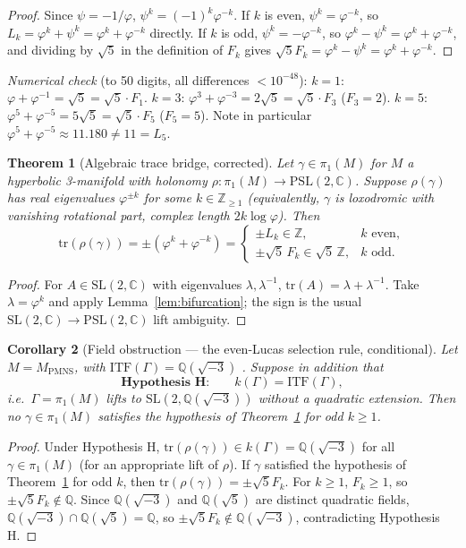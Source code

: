\documentclass[12pt]{article}
\newtheorem{theorem}{Theorem}
\newtheorem{corollary}[theorem]{Corollary}
\theoremstyle{definition}
\newcommand{\Z}{\mathbb{Z}}
\newcommand{\Q}{\mathbb{Q}}
\newcommand{\C}{\mathbb{C}}
\newcommand{\ph}{\varphi}
\newcommand{\logph}{\log\ph}
\newcommand{\tr}{\mathrm{tr}}
\newcommand{\ITF}{\mathrm{ITF}}
\begin{document}
\begin{proof}
Since $\psi=-1/\ph$, $\psi^k=(-1)^k\ph^{-k}$. If $k$ is even,
$\psi^k=\ph^{-k}$, so $L_k=\ph^k+\psi^k=\ph^k+\ph^{-k}$ directly. If
$k$ is odd, $\psi^k=-\ph^{-k}$, so $\ph^k-\psi^k=\ph^k+\ph^{-k}$, and
dividing by $\sqrt5$ in the definition of $F_k$ gives
$\sqrt5F_k=\ph^k-\psi^k=\ph^k+\ph^{-k}$.
\end{proof}

\noindent\emph{Numerical check} (to 50 digits, all differences
$<10^{-48}$): $k=1$: $\ph+\ph^{-1}=\sqrt5=\sqrt5\cdot F_1$. $k=3$:
$\ph^3+\ph^{-3}=2\sqrt5=\sqrt5\cdot F_3$ ($F_3=2$). $k=5$:
$\ph^5+\ph^{-5}=5\sqrt5=\sqrt5\cdot F_5$ ($F_5=5$). Note in particular
$\ph^5+\ph^{-5}\approx11.180\neq11=L_5$.

\begin{theorem}[Algebraic trace bridge, corrected]
\label{thm:bridge}
Let $\gamma\in\pi_1(M)$ for $M$ a hyperbolic 3-manifold with holonomy
$\rho\colon\pi_1(M)\to\mathrm{PSL}(2,\C)$. Suppose $\rho(\gamma)$ has
real eigenvalues $\ph^{\pm k}$ for some $k\in\Z_{\geq1}$ (equivalently,
$\gamma$ is loxodromic with vanishing rotational part, complex length
$2k\logph$). Then
\[
  \tr(\rho(\gamma)) = \pm(\ph^k+\ph^{-k}) =
  \begin{cases}
    \pm L_k \in \Z, & k \text{ even},\\[2pt]
    \pm\sqrt5\,F_k \in \sqrt5\,\Z, & k \text{ odd}.
  \end{cases}
\]
\end{theorem}

\begin{proof}
For $A\in\mathrm{SL}(2,\C)$ with eigenvalues $\lambda,\lambda^{-1}$,
$\tr(A)=\lambda+\lambda^{-1}$. Take $\lambda=\ph^k$ and apply
Lemma~\ref{lem:bifurcation}; the sign is the usual
$\mathrm{SL}(2,\C)\to\mathrm{PSL}(2,\C)$ lift ambiguity.
\end{proof}

\begin{corollary}[Field obstruction --- the even-Lucas selection rule,
conditional]
\label{cor:obstruction}
Let $M=M_{\mathrm{PMNS}}$, with $\ITF(\Gamma)=\Q(\sqrt{-3})$
\cite{maclachlan-reid}. Suppose in addition that
\[
  \textbf{Hypothesis H:} \qquad k(\Gamma) = \ITF(\Gamma),
\]
i.e.\ $\Gamma=\pi_1(M)$ lifts to $\mathrm{SL}(2,\Q(\sqrt{-3}))$ without
a quadratic extension. Then no $\gamma\in\pi_1(M)$ satisfies the
hypothesis of Theorem~\ref{thm:bridge} for odd $k\geq1$.
\end{corollary}

\begin{proof}
Under Hypothesis H, $\tr(\rho(\gamma))\in k(\Gamma)=\Q(\sqrt{-3})$ for
all $\gamma\in\pi_1(M)$ (for an appropriate lift of $\rho$). If
$\gamma$ satisfied the hypothesis of Theorem~\ref{thm:bridge} for odd
$k$, then $\tr(\rho(\gamma))=\pm\sqrt5F_k$. For $k\geq1$, $F_k\geq1$,
so $\pm\sqrt5F_k\notin\Q$. Since $\Q(\sqrt{-3})$ and $\Q(\sqrt5)$ are
distinct quadratic fields, $\Q(\sqrt{-3})\cap\Q(\sqrt5)=\Q$, so
$\pm\sqrt5F_k\notin\Q(\sqrt{-3})$, contradicting Hypothesis H.
\end{proof}
\end{document}
